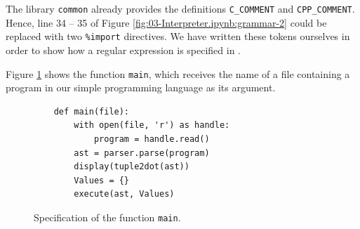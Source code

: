 \remarkEng
The library \texttt{common} already provides the definitions \texttt{C\_COMMENT} and \texttt{CPP\_COMMENT}.
Hence, line 34 -- 35 of Figure \ref{fig:03-Interpreter.ipynb:grammar-2} could be replaced with two
\texttt{\%import} directives.  We have written these tokens ourselves in order to show how a
regular expression is specified in .  \eox
\vspace*{0.2cm}

\noindent
Figure \ref{fig:Interpreter.ipynb:main} shows the function \texttt{main}, which receives the name of a
file containing a program in our simple programming language as its argument.

\begin{figure}[!ht]
\centering
\begin{verbatim}
    def main(file):
        with open(file, 'r') as handle:
            program = handle.read()
        ast = parser.parse(program)
        display(tuple2dot(ast))
        Values = {}
        execute(ast, Values)
\end{verbatim}
\vspace*{-0.3cm}
\caption{Specification of the function \texttt{main}.}
\label{fig:Interpreter.ipynb:main}
\end{figure}

